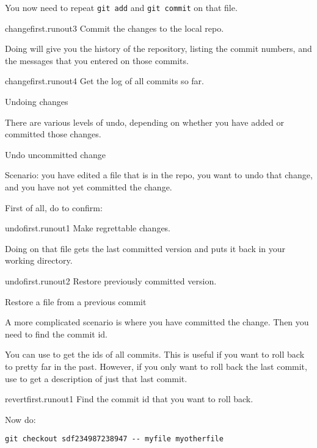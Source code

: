 You now need to repeat \lstinline{git add} and \lstinline{git commit} on that file.

\begin{gitstep}{changefirst.runout3}
  Commit the changes to the local repo.
\end{gitstep}

Doing  will give you the history of the repository,
listing the commit numbers, and the messages that you entered on those commits.

\begin{gitstep}{changefirst.runout4}
  Get the log of all commits so far.
\end{gitstep}

 {Undoing changes}

There are various levels of undo, depending on whether you have added or committed
those changes.

 {Undo uncommitted change}

Scenario: you have edited a file that is in the repo,
you want to undo that change,
and you have not yet committed the change.

First of all, do  to confirm:

\begin{gitstep}{undofirst.runout1}
  Make regrettable changes.
\end{gitstep}

Doing  on that file gets the last committed version
and puts it back in your working directory.

\begin{gitstep}{undofirst.runout2}
  Restore previously committed version.
\end{gitstep}

 {Restore a file from a previous commit}

A more complicated scenario is where you have committed the change.
Then you need to find the commit id.

You can use  to get the ids of all commits.
This is useful if you want to roll back to pretty far in the past.
However, if you only want to roll back the last commit,
use  to get a description of just that last commit.

\begin{gitstep}{revertfirst.runout1}
  Find the commit id that you want to roll back.
\end{gitstep}

Now do:
\begin{lstlisting}
git checkout sdf234987238947 -- myfile myotherfile
\end{lstlisting}

